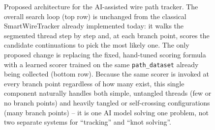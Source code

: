 \begin{figure}[!ht]
{}
    \caption[Proposed architecture for the AI-assisted wire path tracker]{Proposed architecture for the AI-assisted wire path tracker. The overall search loop (top row) is unchanged from the classical SmartWireTracker already implemented today: it walks the segmented thread step by step and, at each branch point, scores the candidate continuations to pick the most likely one. The only proposed change is replacing the fixed, hand-tuned scoring formula with a learned scorer trained on the same \texttt{path\_dataset} already being collected (bottom row). Because the same scorer is invoked at every branch point regardless of how many exist, this single component naturally handles both simple, untangled threads (few or no branch points) and heavily tangled or self-crossing configurations (many branch points) -- it is one AI model solving one problem, not two separate systems for ``tracking'' and ``knot solving''.}
    \label{fig:ai-proposed-tracker}
\end{figure}
